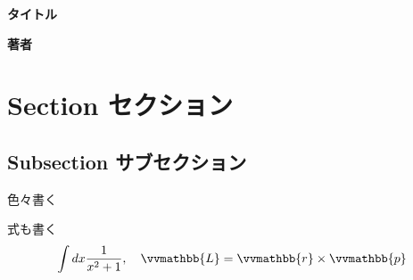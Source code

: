 \documentclass[a4paper,12pt]{jlreq}
\newcommand{\symbb}{\vvmathbb}
\begin{document}
\begin{center}
  \textbf{\sffamily \LARGE タイトル}
\end{center}
\begin{flushright}
  \textbf{\sffamily \Large 著者}  
\end{flushright}
\section{Section セクション}
\subsection{Subsection サブセクション}
色々書く

式も書く
\begin{align}
  \int dx \frac{1}{x^2+1},\quad \symbb{L}=\symbb{r}\times \symbb{p}
\end{align}
\end{document}
